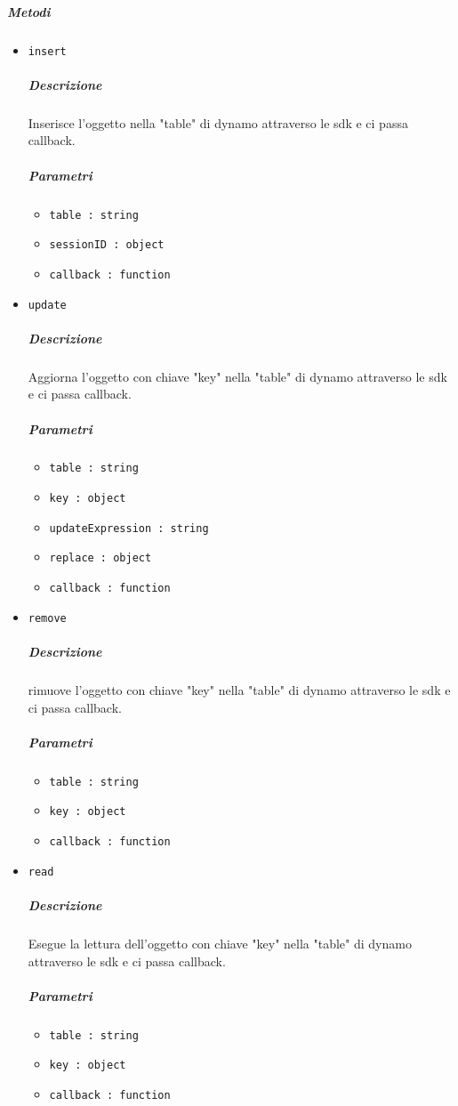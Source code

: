 \documentclass[../ManualeSviluppatore_v2.0.0.tex]{subfiles}
\begin{document}
\subparagraph{Metodi}\begin{itemize}
\item \texttt{insert}
\subparagraph{Descrizione} Inserisce l'oggetto nella "table" di dynamo attraverso le sdk e ci passa callback.
\subparagraph{Parametri}
\begin{itemize}
	\item \texttt{table : string}
	\item \texttt{sessionID : object}
	\item \texttt{callback : function}
\end{itemize}
\item \texttt{update}
\subparagraph{Descrizione} Aggiorna l'oggetto con chiave "key" nella "table" di dynamo attraverso le sdk e ci passa callback.
\subparagraph{Parametri}
\begin{itemize}
	\item \texttt{table : string}
	\item \texttt{key : object}
	\item \texttt{updateExpression : string}
	\item \texttt{replace : object}
	\item \texttt{callback : function}
\end{itemize}

\item \texttt{remove}
\subparagraph{Descrizione} rimuove l'oggetto con chiave "key" nella "table" di dynamo attraverso le sdk e ci passa callback.
\subparagraph{Parametri}
\begin{itemize}
	\item \texttt{table : string}
	\item \texttt{key : object}
	\item \texttt{callback : function}
\end{itemize}

\item \texttt{read}
\subparagraph{Descrizione} Esegue la lettura dell'oggetto con chiave "key" nella "table" di dynamo attraverso le sdk e ci passa callback.
\subparagraph{Parametri}
\begin{itemize}
	\item \texttt{table : string}
	\item \texttt{key : object}
	\item \texttt{callback : function}
\end{itemize}


\end{itemize}
\end{document}
